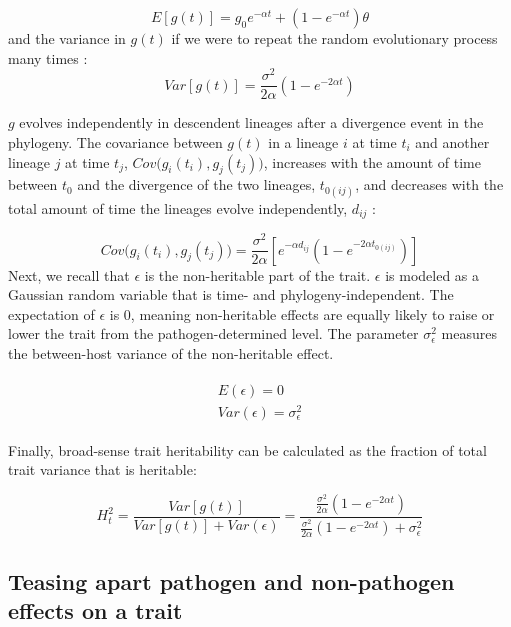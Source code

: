 \documentclass[11pt]{article}
\begin{document}
\begin{linenumbers}
\begin{equation}
   E[g(t)] = g_0e^{-\alpha t} + (1 - e^{-\alpha t})\theta \label{eq:OUmean}
\end{equation}
and the variance in $g(t)$ if we were to repeat the random evolutionary process many times \citep{Butler2004}:
\begin{equation}
    Var[g(t)] = \frac{\sigma^2}{2\alpha}(1 - e^{-2\alpha t}) \label{eq:OUVar}
\end{equation}

$g$ evolves independently in descendent lineages after a divergence event in the phylogeny. The covariance between $g(t)$ in a lineage $i$ at time $t_i$ and another lineage $j$ at time $t_j$, $Cov\big(g_{i}(t_i), g_{j}(t_j)\big)$, increases with the amount of time between $t_0$ and the divergence of the two lineages, $t_{0(ij)}$, and decreases with the total amount of time the lineages evolve independently, $d_{ij}$ \citep{Butler2004}: 

\begin{equation}
	Cov\big(g_{i}(t_i), g_{j}(t_j)\big) = \frac{\sigma^2}{2\alpha}[e^{-\alpha d_{ij}}(1 - e^{-2\alpha t_{0(ij)}})]
	\label{eq:OUcov}
\end{equation}
Next, we recall that $\epsilon$ is the non-heritable part of the trait. $\epsilon$ is modeled as a Gaussian random variable that is time- and phylogeny-independent. The expectation of $\epsilon$ is 0, meaning non-heritable effects are equally likely to raise or lower the trait from the pathogen-determined level. The parameter $\sigma_\epsilon^2$ measures the between-host variance of the non-heritable effect.

\begin{align}
\begin{split}
	E(\epsilon) = 0 \\
	Var(\epsilon) = \sigma^2_\epsilon
\end{split}
\end{align}

Finally, broad-sense trait heritability can be calculated as the fraction of total trait variance that is heritable:

\begin{equation}
	H^2_{t} = \frac{Var[g(t)]}{Var[g(t)] + Var(\epsilon)} = \frac{\frac{\sigma^2}{2\alpha}(1 - e^{-2\alpha t})}{\frac{\sigma^2}{2\alpha}(1 - e^{-2\alpha t}) + \sigma^2_\epsilon}
	\label{eq:POUMM-H2}
\end{equation}

\subsection*{Teasing apart pathogen and non-pathogen effects on a trait}


\end{linenumbers}
\end{document}
